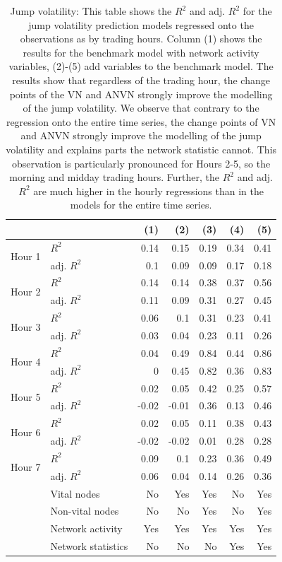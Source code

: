 \begin{table}[ht]
\centering
\caption{Jump volatility: This table shows the $R^2$ and adj. $R^2$ for the jump volatility prediction models regressed onto the observations 
                     as by trading hours. Column (1) shows the results for the benchmark model with network activity variables, (2)-(5) add variables to the benchmark model.  The results show that regardless of the trading hour, the change points of the VN and ANVN strongly 
                     improve the modelling of the jump volatility. We observe that contrary to the regression onto the entire time series, 
                     the change points of VN and ANVN strongly improve the modelling of the jump volatility and explains parts the network statistic cannot. 
                     This observation is particularly pronounced for Hours 2-5, so the morning and midday trading hours. Further, 
                     the $R^2$ and adj. $R^2$ are much higher in the hourly regressions than in the models for the entire time series.} 
\label{table_hourly_JV}
\begingroup\scriptsize
\begin{tabular}{ll|rrrrr}
   &   & (1) & (2) & (3) & (4) & (5) \\ 
  \hline
\multirow{2}{*}{Hour 1} & $R^2$ & 0.14 & 0.15 & 0.19 & 0.34 & 0.41 \\ 
    & adj. $R^2$ & 0.1 & 0.09 & 0.09 & 0.17 & 0.18 \\ 
   \hline
\multirow{2}{*}{Hour 2} & $R^2$ & 0.14 & 0.14 & 0.38 & 0.37 & 0.56 \\ 
    & adj. $R^2$ & 0.11 & 0.09 & 0.31 & 0.27 & 0.45 \\ 
   \hline
\multirow{2}{*}{Hour 3} & $R^2$ & 0.06 & 0.1 & 0.31 & 0.23 & 0.41 \\ 
    & adj. $R^2$ & 0.03 & 0.04 & 0.23 & 0.11 & 0.26 \\ 
   \hline
\multirow{2}{*}{Hour 4} & $R^2$ & 0.04 & 0.49 & 0.84 & 0.44 & 0.86 \\ 
    & adj. $R^2$ & 0 & 0.45 & 0.82 & 0.36 & 0.83 \\ 
   \hline
\multirow{2}{*}{Hour 5} & $R^2$ & 0.02 & 0.05 & 0.42 & 0.25 & 0.57 \\ 
    & adj. $R^2$ & -0.02 & -0.01 & 0.36 & 0.13 & 0.46 \\ 
   \hline
\multirow{2}{*}{Hour 6} & $R^2$ & 0.02 & 0.05 & 0.11 & 0.38 & 0.43 \\ 
    & adj. $R^2$ & -0.02 & -0.02 & 0.01 & 0.28 & 0.28 \\ 
   \hline
\multirow{2}{*}{Hour 7} & $R^2$ & 0.09 & 0.1 & 0.23 & 0.36 & 0.49 \\ 
    & adj. $R^2$ & 0.06 & 0.04 & 0.14 & 0.26 & 0.36 \\ 
   \hline & Vital nodes & No & Yes & Yes & No & Yes \\ & Non-vital nodes & No & No & Yes & No & Yes \\ & Network activity & Yes & Yes & Yes & Yes & Yes \\ & Network statistics & No & No & No & Yes & Yes \\ \hline
\hline
\end{tabular}
\endgroup
\end{table}
